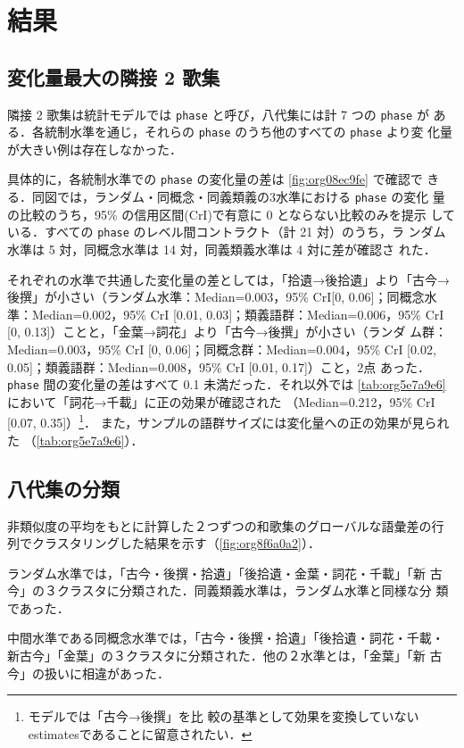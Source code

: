 \documentclass[submit]{ipsj}
\renewcommand{\ref}{\cref}
\begin{document}
\section{結果\label{org98e1845}}
\label{sec:orgd040fd2}
\subsection{変化量最大の隣接 2 歌集\label{org8e55836}}
\label{sec:org7f4cb4c}
隣接 2 歌集は統計モデルでは \texttt{phase} と呼び，八代集には計 7 つの \texttt{phase} が
ある．各統制水準を通じ，それらの \texttt{phase} のうち他のすべての \texttt{phase} より変
化量が大きい例は存在しなかった．

具体的に，各統制水準での \texttt{phase} の変化量の差は \ref{fig:org08ec9fe} で確認で
きる．同図では，ランダム・同概念・同義類義の3水準における \texttt{phase} の変化
量の比較のうち，95\% の信用区間(CrI)で有意に 0 とならない比較のみを提示
している．すべての \texttt{phase} のレベル間コントラクト（計 21 対）のうち，ラ
ンダム水準は 5 対，同概念水準は 14 対，同義類義水準は 4 対に差が確認さ
れた．

それぞれの水準で共通した変化量の差としては，「拾遺→後拾遺」より「古今→
後撰」が小さい（ランダム水準：Median=0.003，95\% CrI[0, 0.06]；同概念水
準：Median=0.002，95\% CrI [0.01, 0.03]；類義語群：Median=0.006，95\%
CrI [0, 0.13]）ことと，「金葉→詞花」より「古今→後撰」が小さい（ランダ
ム群：Median=0.003，95\% CrI [0, 0.06]；同概念群：Median=0.004，95\% CrI
{[}0.02, 0.05]；類義語群：Median=0.008，95\% CrI [0.01, 0.17]）こと，2点
あった． \texttt{phase} 間の変化量の差はすべて 0.1 未満だった．それ以外では
\ref{tab:org5e7a9e6} において「詞花→千載」に正の効果が確認された
（Median=0.212，95\% CrI [0.07, 0.35]）\footnote{モデルでは「古今→後撰」を比
較の基準として効果を変換していないestimatesであることに留意されたい．}．
また，サンプルの語群サイズには変化量への正の効果が見られた
（\ref{tab:org5e7a9e6}）．
\subsection{八代集の分類\label{orgc54564f}}
\label{sec:org833ae31}
非類似度の平均をもとに計算した２つずつの和歌集のグローバルな語彙差の行
列でクラスタリングした結果を示す（\ref{fig:org8f6a0a2}）．

ランダム水準では，「古今・後撰・拾遺」「後拾遺・金葉・詞花・千載」「新
古今」の３クラスタに分類された．同義類義水準は，ランダム水準と同様な分
類であった．

中間水準である同概念水準では，「古今・後撰・拾遺」「後拾遺・詞花・千載・
新古今」「金葉」の３クラスタに分類された．他の２水準とは，「金葉」「新
古今」の扱いに相違があった．
\end{document}
